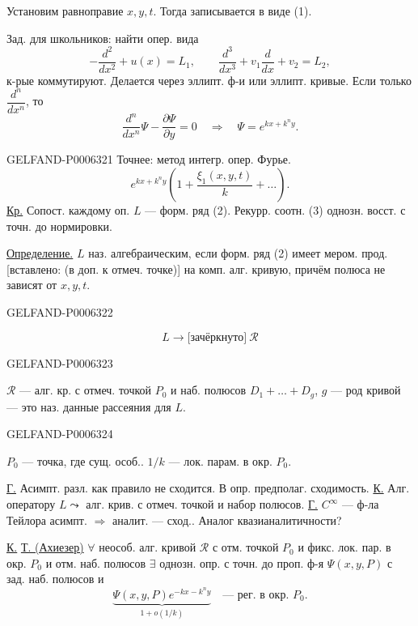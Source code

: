 Установим равноправие \(x,y,t\). Тогда записывается в виде (1).

Зад. для школьников: найти опер. вида
\[
-\frac{d^2}{dx^2}+u(x)=L_1,\qquad
\frac{d^3}{dx^3}+v_1\frac{d}{dx}+v_2=L_2,
\]
к-рые коммутируют. Делается через эллипт. ф-и или эллипт. кривые.
Если только \(\dfrac{d^n}{dx^n}\), то
\[
\frac{d^n}{dx^n}\Psi-\frac{\partial\Psi}{\partial y}=0
\quad\Rightarrow\quad\Psi=e^{kx+k^ny}.
\]


\begin{GelfandAdjacentEvidence}{GELFAND-P000632}{1}
Точнее: метод интегр. опер. Фурье.
\[
e^{kx+k^ny}\left(1+\frac{\xi_1(x,y,t)}{k}+\ldots\right).
\]
\underline{Кр.} Сопост. каждому оп. \(L\) --- форм. ряд (2).
Рекурр. соотн. (3) однозн. восст. с точн. до нормировки.

\underline{Определение.} \(L\) наз. алгебраическим, если форм. ряд (2)
имеет мером. прод. [вставлено: (в доп. к отмеч. точке)]
на комп. алг. кривую, причём полюса не зависят от \(x,y,t\).
\end{GelfandAdjacentEvidence}
\begin{GelfandAdjacentEvidence}{GELFAND-P000632}{2}

\[
L\longrightarrow \text{[зачёркнуто]}\ \mathcal R
\]
\end{GelfandAdjacentEvidence}
\begin{GelfandAdjacentEvidence}{GELFAND-P000632}{3}

\(\mathcal R\) --- алг. кр. с отмеч. точкой \(P_0\) и наб. полюсов
\(D_1+\ldots+D_g\), \(g\) --- род кривой
--- это наз. данные рассеяния для \(L\).
\end{GelfandAdjacentEvidence}
\begin{GelfandAdjacentEvidence}{GELFAND-P000632}{4}

\(P_0\) --- точка, где сущ. особ..
\(1/k\) --- лок. парам. в окр. \(P_0\).

\underline{Г.} Асимпт. разл. как правило не сходится.
В опр. предполаг. сходимость.
\underline{К.} Алг. оператору \(L\leadsto\) алг. крив. с отмеч. точкой и набор полюсов.
\underline{Г.} \(C^\infty\) --- ф-ла Тейлора асимпт. \(\Rightarrow\) аналит. --- сход..
Аналог квазианалитичности?

\underline{К.} \underline{Т. (Ахиезер)}
\(\forall\) неособ. алг. кривой \(\mathcal R\) с отм. точкой \(P_0\)
и фикс. лок. пар. в окр. \(P_0\) и отм. наб. полюсов
\(\exists\) однозн. опр. с точн. до проп. ф-я \(\Psi(x,y,P)\) с зад. наб. полюсов и
\[
\underbrace{\Psi(x,y,P)e^{-kx-k^ny}}_{1+o(1/k)}
\quad\text{--- рег. в окр. }P_0.
\]
\end{GelfandAdjacentEvidence}
